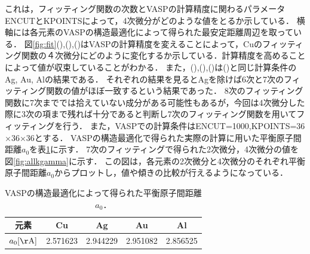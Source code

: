 これは，フィッティング関数の次数とVASPの計算精度に関わるパラメータENCUTとKPOINTSによって，4次微分がどのような値をとるか示している．
横軸には各元素のVASPの構造最適化によって得られた最安定距離周辺を取っている．
図\ref{fig:fit}(),(),()はVASPの計算精度を変えることによって，Cuのフィッティング関数の４次微分にどのように変化するか示している．計算精度を高めることによって値が収束していることがわかる．
また，(),(),()は()と同じ計算条件のAg, Au, Alの結果である．
それぞれの結果を見るとAgを除けば6次と7次のフィッティング関数の値がほぼ一致するという結果であった．
8次のフィッティング関数に7次まででは拾えていない成分がある可能性もあるが，今回は4次微分した際に3次の項まで残れば十分であると判断し7次のフィッティング関数を用いてフィッティングを行う．
また，VASPでの計算条件はENCUT=1000,KPOINTS=36$\times$36$\times$36とする．
VASPの構造最適化で得られた実際の計算に用いた平衡原子間距離$a_0$を表\ref{tb:a0all}に示す．
7次のフィッティングで得られた2次微分，4次微分の値を図\ref{fig:allkgamma}に示す．
この図は，各元素の2次微分と4次微分のそれぞれ平衡原子間距離$a_0$からプロットし，値や傾きの比較が行えるようになっている．
\begin{table}[htbp]
\caption{VASPの構造最適化によって得られた平衡原子間距離$a_0$．}
  \label{tb:a0all}
  \centering
  \begin{tabular}{ccccc}\hline
    元素 & Cu & Ag & Au & Al\\ \hline \hline
    $a_0[\mathrm{\AA}]$ & 2.571623 & 2.944229 & 2.951082 & 2.856525\\ \hline
  \end{tabular}
\end{table}

